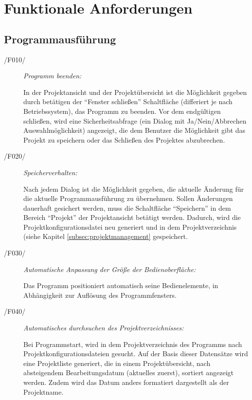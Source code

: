 \section{Funktionale Anforderungen}

\subsection{Programmausführung}

\label{subsec:programmausfuehrung}

	\begin{description}
		
		\item[/F010/] \textit{Programm beenden:}\par In der Projektansicht und der Projektübersicht ist die Möglichkeit gegeben durch betätigen der "`Fenster schließen"' Schaltfläche (differiert je nach Betriebssystem), das Programm zu beenden. Vor dem endgültigen schließen, wird eine Sicherheitsabfrage (ein Dialog mit Ja/Nein/Abbrechen Auswahlmöglichkeit) angezeigt, die dem Benutzer die Möglichkeit gibt das Projekt zu speichern oder das Schließen des Projektes abzubrechen.
		
		\item[/F020/] \textit{Speicherverhalten:}\par Nach jedem Dialog ist die Möglichkeit gegeben, die aktuelle Änderung für die aktuelle Programmausführung zu übernehmen. Sollen Änderungen dauerhaft gesichert werden, muss die Schaltfläche "`Speichern"' in dem Bereich "`Projekt"' der Projektansicht betätigt werden. Dadurch, wird die Projektkonfigurationsdatei neu generiert und in dem Projektverzeichnis (siehe Kapitel \ref{subsec:projektmanagement} gespeichert.
		
		\item[/F030/] \textit{Automatische Anpassung der Größe der Bedienoberfläche:}\par Das Programm positioniert automatisch seine Bedienelemente, in Abhängigkeit zur Auflösung des Programmfensters.
		
		\item[/F040/] \textit{Automatisches durchsuchen des Projektverzeichnisses:}\par Bei Programmstart, wird in dem Projektverzeichnis des Programms nach Projektkonfigurationsdateien gesucht. Auf der Basis dieser Datensätze wird eine Projektliste generiert, die in einem Projektübersicht, nach absteigendem Bearbeitungsdatum (aktuelles zuerst), sortiert angezeigt werden. Zudem wird das Datum anders formatiert dargestellt als der Projektname.
		

\end{description}
